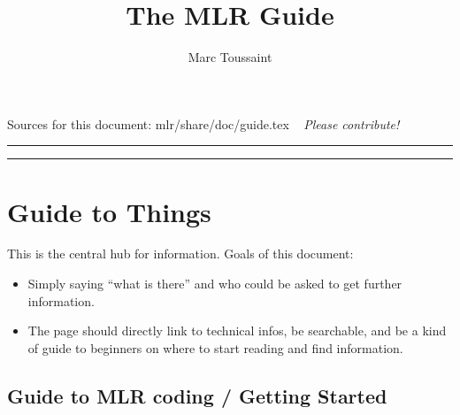 

\title{The MLR Guide}
\author{Marc Toussaint}


\maketitle

\centerline{Sources for this document: mlr/share/doc/guide.tex ~ \emph{Please contribute!}}

{\bigskip\hrule\vspace*{-2ex}\small\tableofcontents\medskip\hrule}

\section{Guide to Things}

This is the central hub for information. Goals of this document:
\begin{itemize}
\item Simply saying ``what is there'' and who could be asked to get further information.

\item The page should directly link to technical infos, be searchable, and be a kind of guide to beginners on where to start reading and find information.
\end{itemize}


\subsection{Guide to MLR coding / Getting Started}

